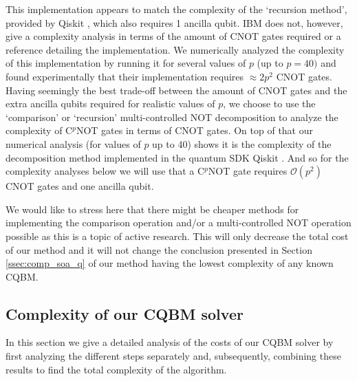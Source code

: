 This implementation appears to match the complexity of the `recursion method', provided by Qiskit \cite{ Qiskit}, which also requires 1 ancilla qubit. 
IBM does not, however, give a complexity analysis in terms of the amount of CNOT gates required or a reference detailing the implementation. We numerically analyzed the complexity of this implementation by running it for several values of $p$ (up to $p=40)$ and found experimentally that their implementation requires $\approx 2 p^2$ CNOT gates. \\

Having seemingly the best trade-off between the amount of CNOT gates and the extra ancilla qubits required for realistic values of $p$, we choose to use the `comparison' or `recursion' multi-controlled NOT decomposition to analyze the complexity of C$^p$NOT gates in terms of CNOT gates. On top of that our numerical analysis (for values of $p$ up to 40) shows it is the complexity of the decomposition method implemented in the  quantum SDK Qiskit \cite{Qiskit}.
And so for the complexity analyses below we will use that a C$^p$NOT gate requires $\mathcal{O} \left (p^2 \right )$ CNOT gates and one ancilla qubit. 

We would like to stress here that there might be cheaper methods for implementing the comparison operation and/or a multi-controlled NOT operation possible as this is a topic of active research. This will only decrease the total cost of our method and it will not change the conclusion presented in Section \ref{ssec:comp_soa_q} of our method having the lowest complexity of any known CQBM. 

\subsection{Complexity of our CQBM solver}\label{ssec:multi not impl}
In this section we give a detailed analysis of the costs of our CQBM solver by first analyzing the different steps separately and, subsequently, combining these results to find the total complexity of the algorithm. 

